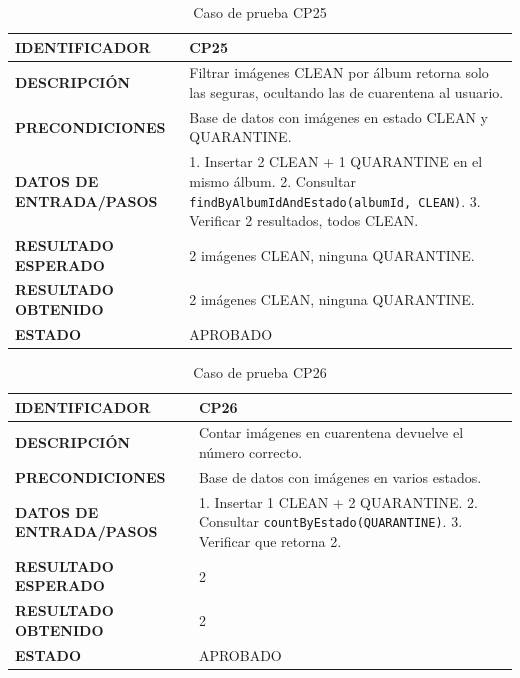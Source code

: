 \begin{table}[H]
\centering
\caption{Caso de prueba CP25}
\begin{tabular}{|p{3.5cm}|p{10.3cm}|}
\hline
\textbf{IDENTIFICADOR} & CP25 \\
\hline
\textbf{DESCRIPCIÓN} & Filtrar imágenes CLEAN por álbum retorna solo las seguras, ocultando las de cuarentena al usuario. \\
\hline
\textbf{PRECONDICIONES} & Base de datos con imágenes en estado CLEAN y QUARANTINE. \\
\hline
\textbf{DATOS DE ENTRADA/PASOS} & 1. Insertar 2 CLEAN + 1 QUARANTINE en el mismo álbum. 2. Consultar \texttt{findByAlbumIdAndEstado(albumId, CLEAN)}. 3. Verificar 2 resultados, todos CLEAN. \\
\hline
\textbf{RESULTADO ESPERADO} & 2 imágenes CLEAN, ninguna QUARANTINE. \\
\hline
\textbf{RESULTADO OBTENIDO} & 2 imágenes CLEAN, ninguna QUARANTINE. \\
\hline
\textbf{ESTADO} & APROBADO \\
\hline
\end{tabular}
\end{table}

\begin{table}[H]
\centering
\caption{Caso de prueba CP26}
\begin{tabular}{|p{3.5cm}|p{10.3cm}|}
\hline
\textbf{IDENTIFICADOR} & CP26 \\
\hline
\textbf{DESCRIPCIÓN} & Contar imágenes en cuarentena devuelve el número correcto. \\
\hline
\textbf{PRECONDICIONES} & Base de datos con imágenes en varios estados. \\
\hline
\textbf{DATOS DE ENTRADA/PASOS} & 1. Insertar 1 CLEAN + 2 QUARANTINE. 2. Consultar \texttt{countByEstado(QUARANTINE)}. 3. Verificar que retorna 2. \\
\hline
\textbf{RESULTADO ESPERADO} & 2 \\
\hline
\textbf{RESULTADO OBTENIDO} & 2 \\
\hline
\textbf{ESTADO} & APROBADO \\
\hline
\end{tabular}
\end{table}

